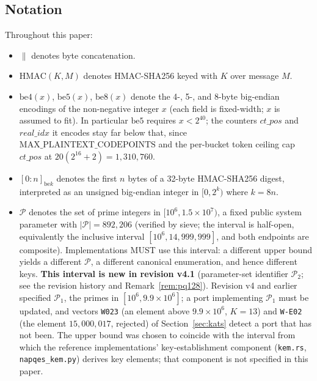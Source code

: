 \documentclass[11pt,a4paper]{article}
\begin{document}
\subsection{Notation}
\label{sec:notation}

Throughout this paper:
\begin{itemize}
  \item $\|$ denotes byte concatenation.
  \item $\mathrm{HMAC}(K, M)$ denotes HMAC-SHA256 keyed with $K$ over message $M$.
  \item $\mathrm{be4}(x)$, $\mathrm{be5}(x)$, $\mathrm{be8}(x)$ denote the
        4-, 5-, and 8-byte big-endian encodings of the non-negative integer
        $x$ (each field is fixed-width; $x$ is assumed to fit). In
        particular $\mathrm{be5}$ requires $x<2^{40}$; the counters
        $ct\_pos$ and $real\_idx$ it encodes stay far below that, since
        $\mathrm{MAX\_PLAINTEXT\_CODEPOINTS}$ and the per-bucket token
        ceiling cap $ct\_pos$ at $20(2^{16}+2)=1{,}310{,}760$.
  \item $[0{:}n]_{\mathrm{be}k}$ denotes the first $n$ bytes of a 32-byte
        HMAC-SHA256 digest, interpreted as an unsigned big-endian integer
        in $[0,2^{k})$ where $k=8n$.
  \item $\mathcal{P}$ denotes the set of prime integers in $[10^6, 1.5 \times 10^7)$,
        a fixed public system parameter with $|\mathcal{P}| = 892{,}206$
        (verified by sieve; the interval is half-open, equivalently the
        inclusive interval $[10^6, 14{,}999{,}999]$, and both endpoints are
        composite). Implementations MUST use this interval:
        a different upper bound yields a different $\mathcal{P}$, a
        different canonical enumeration, and hence different keys.
        \textbf{This interval is new in revision v4.1} (parameter-set
        identifier $\mathcal{P}_2$; see the revision history and
        Remark~\ref{rem:pq128}). Revision v4 and earlier specified
        $\mathcal{P}_1$, the primes in $[10^6, 9.9\times10^6]$; a port
        implementing $\mathcal{P}_1$ must be updated, and vectors
        \texttt{W023} (an element above $9.9\times10^6$, $K=13$) and
        \texttt{W-E02} (the element $15{,}000{,}017$, rejected) of
        Section~\ref{sec:kats} detect a port that has not been. The upper
        bound was chosen to coincide with the interval from which the
        reference implementations' key-establishment component
        (\texttt{kem.rs}, \texttt{napqes\_kem.py}) derives key elements;
        that component is not specified in this paper.
\end{itemize}
\end{document}
